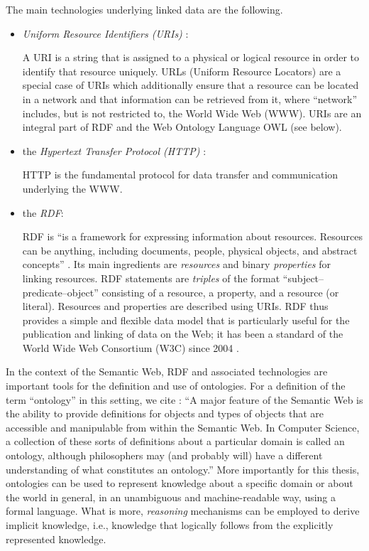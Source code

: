 The main technologies underlying linked data are the following.
%
\begin{itemize}
  \item
    \emph{Uniform Resource Identifiers (URIs)} \autocite{RFC3986}:
    
    \par
    A URI is a string that is assigned to a physical or logical resource
    in order to identify that resource uniquely. URLs (Uniform Resource Locators)
    are a special case of URIs which additionally ensure that a resource
    can be located in a network and that information can be retrieved from it,
    where \enquote{network} includes, but is not restricted to, the World Wide Web (WWW).
    URIs are an integral part of RDF and the Web Ontology Language OWL (see below).
  \item
    the \emph{Hypertext Transfer Protocol (HTTP)} \autocite{HTTP}:
    
    \par
    HTTP is the fundamental protocol for data transfer and communication underlying the WWW.
  \item
    the \emph{\gls{RDF}}:
    
    \par
    \gls{RDF} is \enquote{is a framework for expressing information about resources. Resources can be anything, including documents, people, physical objects, and abstract concepts}
    \autocite{RDFPrimer}.
    Its main ingredients are \emph{resources} and binary \emph{properties} for linking resources.
    \gls{RDF} statements are \emph{triples} of the format \enquote{subject--predicate--object}
    consisting of a resource, a property, and a resource (or literal).
    Resources and properties are described using URIs.
    \gls{RDF} thus provides a simple and flexible data model that is particularly useful for the publication
    and linking of data on the Web;
    it has been a standard of the
    World Wide Web Consortium (W3C) since 2004 \autocite{W3CRDF}.
\end{itemize}
%
In the context of the Semantic Web, \gls{RDF} and associated technologies
are important tools for the definition and use of ontologies.
For a definition of the term \enquote{ontology} in this setting, we cite \textcite{Horrocks2011}:
\enquote{A major feature of the Semantic Web is the ability to provide definitions for objects and types of objects that are accessible and manipulable from within the Semantic Web. In Computer Science, a collection of these sorts of definitions about a particular domain is called an ontology, although philosophers may (and probably will) have a different understanding of what constitutes an ontology.}
More importantly for this thesis, ontologies can be used to represent knowledge about a specific domain
or about the world in general, in an unambiguous and machine-readable way, using a formal language.
What is more, \emph{reasoning} mechanisms can be employed to derive implicit knowledge,
i.e., knowledge that logically follows from the explicitly represented knowledge.

